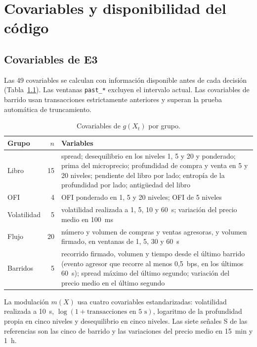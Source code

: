 \chapter{Covariables y disponibilidad del código}
\label{app:trazabilidad}

\section{Covariables de E3}
Las 49 covariables se calculan con información disponible antes de cada decisión (Tabla~\ref{tab:covariables}). Las ventanas \texttt{past\_*} excluyen el intervalo actual. Las covariables de barrido usan transacciones estrictamente anteriores y superan la prueba automática de truncamiento.

\begin{table}[htbp]
\centering\footnotesize
\caption[Covariables de E3 por grupo.]{Covariables de $g(X_t)$ por grupo.}
\label{tab:covariables}
\begin{tabular}{@{}p{}rp{}@{}}\toprule
Grupo & $n$ & Variables\\\midrule
Libro & 15 & spread; desequilibrio en los niveles 1, 5 y 20 y ponderado; prima del microprecio; profundidad de compra y venta en 5 y 20 niveles; pendiente del libro por lado; entropía de la profundidad por lado; antigüedad del libro\\
OFI & 4 & OFI ponderado en 1, 5 y 20 niveles; OFI de 5 niveles\\
Volatilidad & 5 & volatilidad realizada a 1, 5, 10 y 60~s; variación del precio medio en 100~ms\\
Flujo & 20 & número y volumen de compras y ventas agresoras, y volumen firmado, en ventanas de 1, 5, 30 y 60~s\\
Barridos & 5 & recorrido firmado, volumen y tiempo desde el último barrido (evento agresor que recorre al menos 0,5~bps, en los últimos 60~s); spread máximo del último segundo; variación del precio medio en el último segundo\\\bottomrule
\end{tabular}
\end{table}

La modulación $m(X)$ usa cuatro covariables estandarizadas: volatilidad realizada a 10~s, $\log(1+\text{transacciones en 5~s})$, logaritmo de la profundidad propia en cinco niveles y desequilibrio en cinco niveles. Las siete señales S de las referencias son las cinco de barrido y las variaciones del precio medio en 15~min y 1~h.

